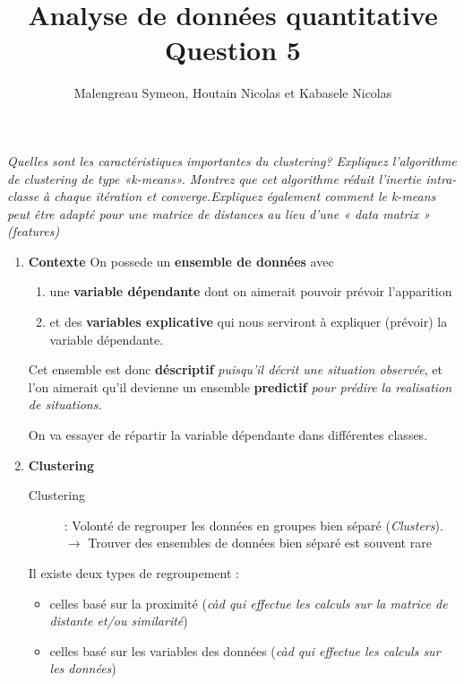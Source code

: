 \documentclass[a4paper, 11pt, onecolumn]{article}
\title{Analyse de données quantitative\\Question 5}
\author{Malengreau Symeon, Houtain Nicolas et Kabasele Nicolas}
\date{}
\begin{document}
\maketitle

\textit{Quelles sont les caractéristiques importantes du clustering? Expliquez l’algorithme de clustering de type «k-means». Montrez que cet algorithme réduit l’inertie intra-classe à chaque itération et converge.Expliquez également comment le k-means peut être adapté pour
une matrice de distances au lieu d’une « data matrix » (features)}

\begin{enumerate}
\item \textbf{Contexte}
  On possede un \textbf{ensemble de données} avec 
  
  \begin{enumerate}
    \item {une \textbf{variable dépendante} dont on aimerait pouvoir prévoir l'apparition}
    \item {et des \textbf{variables explicative} qui nous serviront à expliquer (prévoir) la variable dépendante.}
  \end{enumerate}
  
  Cet ensemble est donc \textbf{déscriptif} \textit{puisqu'il décrit une situation observée}, et l'on aimerait qu'il devienne un ensemble\textbf{ predictif} \textit{pour prédire la realisation de situations.}

On va essayer de répartir la variable dépendante dans différentes classes.

  \begin{description}
  \end{description}

\item \textbf{Clustering}

  \begin{description}
    \item[Clustering] : Volonté de regrouper les données en groupes bien séparé (\textit{Clusters}). $\rightarrow$ Trouver des ensembles de données bien séparé est souvent rare
  \end{description}

Il existe deux types de regroupement : 
\begin{itemize}
  \item celles basé sur la proximité (\textit{càd qui effectue
les calculs sur la matrice de distante et/ou similarité})
\item celles basé sur les variables des données (\textit{càd qui effectue les calculs sur les
  données})
  \end{itemize}


\end{enumerate}
\end{document}
